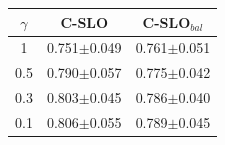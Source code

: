 \begin{tabular}{ccc}
\toprule
$\gamma$ & C-SLO & C-SLO$_{bal}$\\
\midrule
1 & 0.751$\pm$0.049 & 0.761$\pm$0.051 \\
0.5 & 0.790$\pm$0.057 & 0.775$\pm$0.042 \\
0.3 & 0.803$\pm$0.045 & 0.786$\pm$0.040 \\
0.1 & 0.806$\pm$0.055 & 0.789$\pm$0.045 \\
\bottomrule
\end{tabular}
